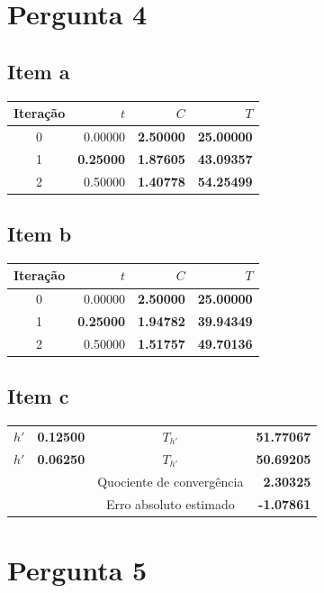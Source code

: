 {\section{Pergunta 4}

\begin{center}
    \begin{minipage}[c]{0.5\textwidth}
        \subsection{Item a}
        \begin{center} \begin{tabular}{c | r | r | r}
            Iteração & $t$ & $C$ & $T$ \\ \hline
            0        & 0.00000 & \textbf{2.50000} & \textbf{25.00000} \\
            1        & \textbf{0.25000} & \textbf{1.87605} & \textbf{43.09357} \\
            2        & 0.50000 & \textbf{1.40778} & \textbf{54.25499}
        \end{tabular} \end{center}
    \end{minipage}%
    \begin{minipage}[c]{0.5\textwidth}
        \subsection{Item b}
        \begin{center} \begin{tabular}{c | r | r | r}
            Iteração & $t$ & $C$ & $T$ \\ \hline
            0        & 0.00000 & \textbf{2.50000} & \textbf{25.00000} \\
            1        & \textbf{0.25000} & \textbf{1.94782} & \textbf{39.94349} \\
            2        & 0.50000 & \textbf{1.51757} & \textbf{49.70136}
        \end{tabular} \end{center}
    \end{minipage}%
\end{center}
\subsection{Item c}
\begin{center} \begin{tabular}{c | r || c | r}
    $h' $ & \textbf{0.12500} & $T_{h' }$ & \textbf{51.77067} \\
    $h' $ & \textbf{0.06250} & $T_{h' }$ & \textbf{50.69205} \\
          &                  & Quociente de convergência & \textbf{2.30325} \\
          &                  & Erro absoluto estimado & \textbf{-1.07861}
\end{tabular} \end{center}

\section{Pergunta 5}

}